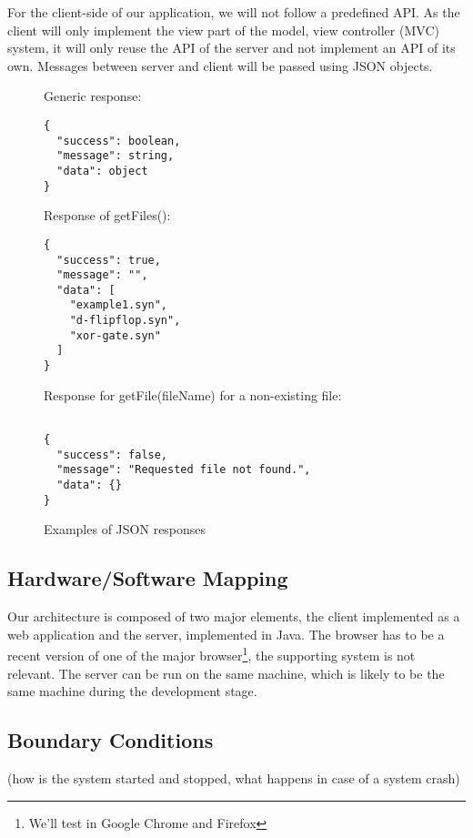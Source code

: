 \documentclass[a4paper]{article}
\begin{document}
For the client-side of our application, we will not follow a predefined API. As the client will only implement the view part of the model, view controller (MVC) system, it will only reuse the API of the server and not implement an API of its own. Messages between server and client will be passed using JSON objects. \\

\begin{figure}[h!]
\caption{Examples of JSON responses}
Generic response:
\begin{verbatim}
{
  "success": boolean,
  "message": string,
  "data": object
}
\end{verbatim}
Response of getFiles(): \begin{verbatim}
{
  "success": true,
  "message": "",
  "data": [
    "example1.syn",
    "d-flipflop.syn",
    "xor-gate.syn"
  ]
}
\end{verbatim}
Response for getFile(fileName) for a non-existing file:
\begin{verbatim}

{
  "success": false,
  "message": "Requested file not found.",
  "data": {}
}
\end{verbatim}
\end{figure}

\pagebreak
\pagebreak

\subsection{Hardware/Software Mapping}
Our architecture is composed of two major elements, the client implemented as a web application and the server, implemented in Java. The browser has to be a recent version of one of the major browser\footnote{We'll test in Google Chrome and Firefox}, the supporting system is not relevant. The server can be run on the same machine, which is likely to be the same machine during the development stage.



\subsection{Boundary Conditions}
(how is the system started and stopped, what happens
in case of a system crash)
\end{document}
